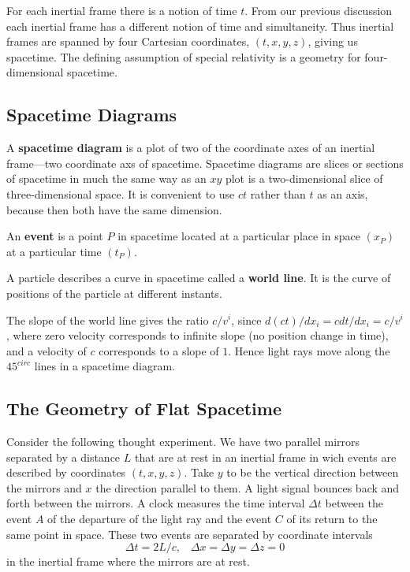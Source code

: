 For each inertial frame there is a notion of time $t$. From our previous discussion each inertial frame has a different notion of time and simultaneity. Thus inertial frames are spanned by four Cartesian coordinates, $(t,x,y,z)$, giving us spacetime. The defining assumption of special relativity is a geometry for four-dimensional spacetime.

\subsection{Spacetime Diagrams}

A \textbf{spacetime diagram} is a plot of two of the coordinate axes of an inertial frame---two coordinate axs of spacetime. Spacetime diagrams are slices or sections of spacetime in much the same way as an $xy$ plot is a two-dimensional slice of three-dimensional space. It is convenient to use $ct$ rather than $t$ as an axis, because then both have the same dimension.

\begin{defn}
    An \textbf{event} is a point $P$ in spacetime located at a particular place in space $(x_P)$ at a particular time $(t_P)$.
\end{defn}

\begin{defn}
    A particle describes a curve in spacetime called a \textbf{world line}. It is the curve of positions of the particle at different instants.
\end{defn}

The slope of the world line gives the ratio $c/v^i$, since $d(ct)/dx_i = cdt/dx_i = c/v^i$, where zero velocity corresponds to infinite slope (no position change in time), and a velocity of $c$ corresponds to a slope of $1$. Hence light rays move along the $45^{circ}$ lines in a spacetime diagram.

\subsection{The Geometry of Flat Spacetime}

Consider the following thought experiment. We have two parallel mirrors separated by a distance $L$ that are at rest in an inertial frame in wich events are described by coordinates $(t,x,y,z)$. Take $y$ to be the vertical direction between the mirrors and $x$ the direction parallel to them. A light signal bounces back and forth between the mirrors. A clock measures the time interval $\Delta t$ between the event $A$ of the departure of the light ray and the event $C$ of its return to the same point in space. These two events are separated by coordinate intervals $$\Delta t = 2L/c,\;\;\;\Delta x = \Delta y = \Delta z = 0$$
in the inertial frame where the mirrors are at rest.

